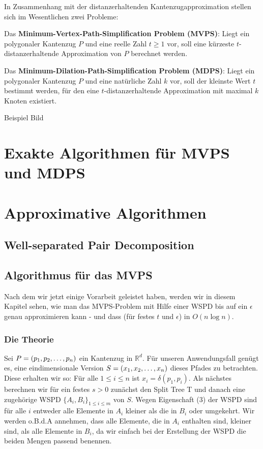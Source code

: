 \documentclass[11pt]{article}
\newcommand{\R}{\mathbb{R}}
\begin{document}
	In Zusammenhang mit der distanzerhaltenden Kantenzugapproximation stellen sich im Wesentlichen zwei Probleme:
	
	\noindent Das \textbf{Minimum-Vertex-Path-Simplification Problem (MVPS)}: Liegt ein polygonaler Kantenzug $P$ und eine reelle Zahl $t \geq 1$ vor, soll eine kürzeste $t$-distanzerhaltende Approximation von $P$ berechnet werden.
	
	\noindent Das \textbf{Minimum-Dilation-Path-Simplification Problem (MDPS)}: Liegt ein polygonaler Kantenzug $P$ und eine natürliche Zahl $k$ vor, soll der kleinste Wert $t$ bestimmt werden, für den eine $t$-distanzerhaltende Approximation mit maximal $k$ Knoten existiert.

    Beispiel Bild

    \section{Exakte Algorithmen für MVPS und MDPS}
    \label{sec:exact}
    
    
    \section{Approximative Algorithmen}
    \label{sec:approximative}
    

    \subsection{Well-separated Pair Decomposition}
    \label{subsec:wspd}
    
    
    \subsection{Algorithmus für das MVPS}
    \label{subsec:mvps}
    Nach dem wir jetzt einige Vorarbeit geleistet haben, werden wir in diesem Kapitel sehen, wie man das MVPS-Problem mit Hilfe einer WSPD bis auf ein $\epsilon$ genau approximieren kann - und dass (für festes $t$ und $\epsilon$) in $O(n\log n)$.
    
    \subsubsection*{Die Theorie}
    Sei $P = (p_1, p_2, \mathellipsis, p_n)$ ein Kantenzug in $\R^d$. Für unseren Anwendungsfall genügt es, eine eindimensionale Version $S = (x_1, x_2, \mathellipsis, x_n)$ dieses Pfades zu betrachten. Diese erhalten wir so: Für alle $1 \leq i \leq n$ ist $x_i = \delta(p_1, p_i)$.
    Als nächstes berechnen wir für ein festes $s > 0$ zunächst den Split Tree T und danach eine zugehörige WSPD $\{A_i, B_i\}_{1 \leq i \leq m}$ von $S$. Wegen Eigenschaft (3) der WSPD sind für alle $i$ entweder alle Elemente in $A_i$ kleiner als die in $B_i$ oder umgekehrt. Wir werden o.B.d.A annehmen, dass alle Elemente, die in $A_i$ enthalten sind, kleiner sind, als alle Elemente in $B_i$, da wir einfach bei der Erstellung der WSPD die beiden Mengen passend benennen.
    
\end{document}
